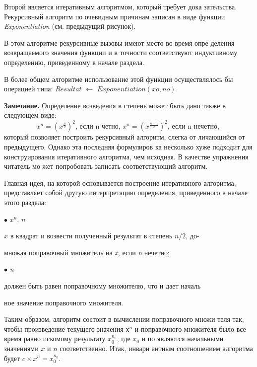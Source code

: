 Второй является итеративным алгоритмом, который требует дока­
зательства. Рекурсивный алгоритм по очевидным причинам записан в
виде функции \textit{Exponentiation} (см. предыдущий рисунок).

В этом алгоритме рекурсивные вызовы имеют место во время опре­
деления возвращаемого значения функции и в точности соответствуют
индуктивному определению, приведенному в начале раздела.

В более общем алгоритме использование этой функции осуществля­лось
 бы операцией типа: \textit{$Resultat$} $\leftarrow$ \textit{$Exponentiation(xo,no)$}.
\newline
\begin{center}
\parbox{11cm}
{
\textbf{Замечание.} Определение возведения в степень может быть дано
также в следующем виде:
\begin{equation*}
x^{n} = (x^{ \frac{n}{2} }) ^ {2} \text{, если n четно, } x^{n} = (x^{ \frac{n-1}{2} }) ^ {2}  \text{, если n нечетно, }
\end{equation*}
который позволяет построить рекурсивный алгоритм, слегка от­
личающийся от предыдущего. Однако эта последняя формулиров­
ка несколько хуже подходит для конструирования итеративного
алгоритма, чем исходная. В качестве упражнения читатель мо­
жет попробовать записать соответствующий алгоритм.
}
\end{center}
Главная идея, на которой основывается построение итеративного
алгоритма, представляет собой другую интерпретацию определения,
приведенного в начале этого раздела:

\parindent=1.2cm $\bullet$  \textit{$x^{n}$},  \textit{$n$} 

\parindent=1.2cm  \textit{$x$} в квадрат и возвести полученный результат в степень \textit{$n/2$}, до-

\parindent=1.2cm множая поправочный множитель на \textit{x}, если \textit{n} нечетно;

\parindent=1.2cm $\bullet$  \textit{n} 

\parindent=1.2cm должен быть равен поправочному множителю, что и дает началь­

\parindent=1.2cm ное значение поправочного множителя.

\noindent Таким образом, алгоритм состоит в вычислении поправочного множи­
теля так, чтобы произведение текущего значения \textit{$х^{n}$} и поправочного
множителя было все время равно искомому результату \textit{$x_{0}^{n_{0}}$}, где \textit{$x_{0}$} и по
являются начальными значениями \textit{$x$} и \textit{$n$} соответственно. Итак, инвари­
антным соотношением алгоритма будет \textit{$c \times x^{n} = x_0^{n_0}$}.
\pagebreak

